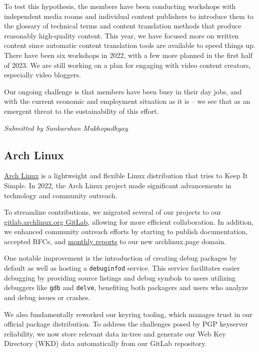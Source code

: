 \documentclass[a4paper]{report}
\begin{document}
To test this hypothesis, the members have been conducting workshops
with independent media rooms and individual content publishers to introduce them to the glossary of technical terms and content translation methods that produce reasonably high-quality content. This year, we have focused more on written content since automatic content translation tools are available to speed things up. There have been six workshops in 2022, with a few more planned in the first half of 2023. We are still working on a plan for engaging with video content creators, especially video bloggers.

Our ongoing challenge is that members have been busy in their day jobs, and with the current economic and employment situation as it is -- we see that as an emergent threat to the sustainability of this effort.

{\em Submitted by Sankarshan Mukhopadhyay}

\subsection{Arch Linux}

\href{https://archlinux.org/}{Arch Linux} is a lightweight and flexible Linux distribution that tries to Keep It Simple. In 2022, the Arch Linux project made significant advancements in technology and community outreach.

To streamline contributions, we migrated several of our projects to our \href{https://gitlab.archlinux.org}{gitlab.archlinux.org GitLab}, allowing for more efficient collaboration. In addition, we enhanced community outreach efforts by starting to publish documentation, accepted RFCs, and \href{https://monthly-reports.archlinux.page/}{monthly reports} to our new archlinux.page domain.

One notable improvement is the introduction of creating debug packages by default as well as hosting a {\tt debuginfod} service. This service facilitates easier debugging by providing source listings and debug symbols to users utilizing debuggers like {\tt gdb} and {\tt delve}, benefiting both packagers and users who analyze and debug issues or crashes.

We also fundamentally reworked our keyring tooling, which manages trust in our official package distribution. To address the challenges posed by PGP keyserver reliability, we now store relevant data in-tree and generate our Web Key Directory
(WKD) data automatically from our GitLab repository.
\end{document}
